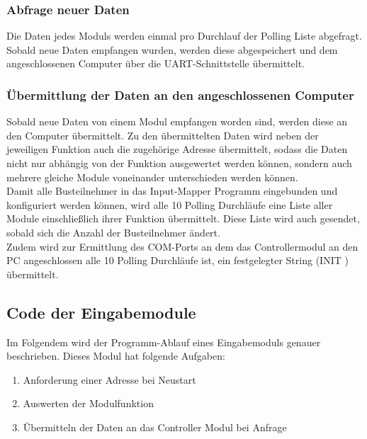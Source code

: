 \subsubsection{Abfrage neuer Daten}
Die Daten jedes Moduls werden einmal pro Durchlauf der Polling Liste abgefragt. Sobald neue Daten empfangen wurden, werden diese abgespeichert und dem angeschlossenen Computer über die UART-Schnittstelle übermittelt.\\



\subsubsection{Übermittlung der Daten an den angeschlossenen Computer}
Sobald neue Daten von einem Modul empfangen worden sind, werden diese an den Computer übermittelt. Zu den übermittelten Daten wird neben der jeweiligen Funktion auch die zugehörige Adresse übermittelt, sodass die Daten nicht nur abhängig von der Funktion ausgewertet werden können, sondern auch mehrere gleiche Module voneinander unterschieden werden können.\\
Damit alle Busteilnehmer in das Input-Mapper Programm eingebunden und konfiguriert werden können, wird alle 10 Polling Durchläufe eine Liste aller Module einschließlich ihrer Funktion übermittelt. Diese Liste wird auch gesendet, sobald sich die Anzahl der Busteilnehmer ändert.\\
Zudem wird zur Ermittlung des COM-Ports an dem das Controllermodul an den PC angeschlossen alle 10 Polling Durchläufe ist, ein festgelegter String (\glqq INIT
\grqq) übermittelt.


\subsection{Code der Eingabemodule}
\label{Code der Eingabemodule}
Im Folgendem wird der Programm-Ablauf eines Eingabemoduls genauer beschrieben. Dieses Modul hat folgende Aufgaben:
\begin{enumerate}
	\item Anforderung einer Adresse bei Neustart
	\item Auswerten der Modulfunktion
	\item Übermitteln der Daten an das Controller Modul bei Anfrage
\end{enumerate}


